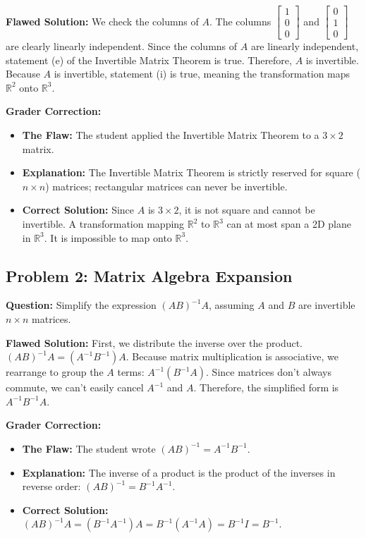 \documentclass[12pt]{article}
\begin{document}
\textbf{Flawed Solution:} 
We check the columns of $A$. The columns $\begin{bmatrix} 1 \\ 0 \\ 0 \end{bmatrix}$ and $\begin{bmatrix} 0 \\ 1 \\ 0 \end{bmatrix}$ are clearly linearly independent. Since the columns of $A$ are linearly independent, statement (e) of the Invertible Matrix Theorem is true. Therefore, $A$ is invertible. Because $A$ is invertible, statement (i) is true, meaning the transformation maps $\mathbb{R}^2$ onto $\mathbb{R}^3$. 

\textbf{Grader Correction:}
\begin{itemize}
    \item \textbf{The Flaw:} The student applied the Invertible Matrix Theorem to a $3 \times 2$ matrix.
    \item \textbf{Explanation:} The Invertible Matrix Theorem is strictly reserved for square ($n \times n$) matrices; rectangular matrices can never be invertible.
    \item \textbf{Correct Solution:} Since $A$ is $3 \times 2$, it is not square and cannot be invertible. A transformation mapping $\mathbb{R}^2$ to $\mathbb{R}^3$ can at most span a 2D plane in $\mathbb{R}^3$. It is impossible to map onto $\mathbb{R}^3$.
\end{itemize}

\subsection{Problem 2: Matrix Algebra Expansion}
\textbf{Question:} Simplify the expression $(AB)^{-1} A$, assuming $A$ and $B$ are invertible $n \times n$ matrices.

\textbf{Flawed Solution:}
First, we distribute the inverse over the product. 
$(AB)^{-1} A = (A^{-1} B^{-1}) A$.
Because matrix multiplication is associative, we rearrange to group the $A$ terms:
$A^{-1} (B^{-1} A)$.
Since matrices don't always commute, we can't easily cancel $A^{-1}$ and $A$. Therefore, the simplified form is $A^{-1} B^{-1} A$.

\textbf{Grader Correction:}
\begin{itemize}
    \item \textbf{The Flaw:} The student wrote $(AB)^{-1} = A^{-1}B^{-1}$.
    \item \textbf{Explanation:} The inverse of a product is the product of the inverses in reverse order: $(AB)^{-1} = B^{-1}A^{-1}$.
    \item \textbf{Correct Solution:} $(AB)^{-1} A = (B^{-1} A^{-1}) A = B^{-1} (A^{-1} A) = B^{-1} I = B^{-1}$.
\end{itemize}
\end{document}

